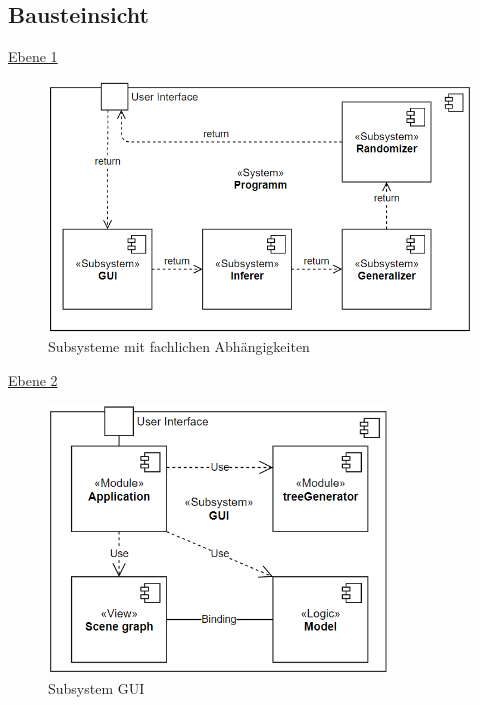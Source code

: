 \documentclass[11pt]{article}
\begin{document}
    \subsection{Bausteinsicht}
    \underline{Ebene 1}
    \begin{figure}[H]
        \centering
        \includegraphics[width=12cm]{../images/Bausteinsicht_Ebene_1.PNG}
        \caption{Subsysteme mit fachlichen Abhängigkeiten}
    \end{figure}
    \underline{Ebene 2}
    \begin{figure}[H]
        \centering
        \includegraphics[width=9cm]{../images/Bausteinsicht_Ebene_2.PNG}
        \caption{Subsystem GUI}
    \end{figure}
\end{document}
